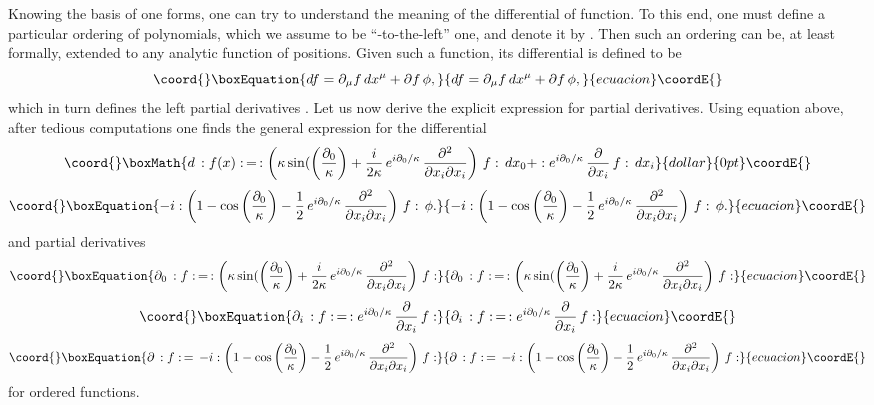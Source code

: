 \documentclass  [12pt] {article}
\begin{document}
Knowing the basis of one forms, one can try to understand the meaning of the
differential of  function. To this end, one must define a particular ordering
of polynomials, which we assume to be ``\coordHE{}-to-the-left'' one, and denote it
by \myHighlight{$:\, \ast \, :$}\coordHE{}. Then such an ordering can be, at least formally, extended
to any analytic function of positions. Given such a function, its differential
is defined to be
\begin{equation}\coord{}\boxEquation{\label{35}
df = \partial_\mu f\, dx^\mu + \partial f\, \phi,
}{df = \partial_\mu f\, dx^\mu + \partial f\, \phi,
}{ecuacion}\coordE{}\end{equation}
which in turn defines the left partial derivatives \myHighlight{$\partial_\mu, \partial$}\coordHE{}.
Let us now derive the explicit expression for partial derivatives. Using
equation above, after tedious computations one finds the general expression for
the differential \cite{5dcalc3}
$$\coord{}\boxMath{
d\, :f(x):\, = \, :\left(\kappa\sin(\left(\frac{\partial_0}\kappa\right) +
\frac{i}{2\kappa}\,  e^{i\partial_0/\kappa}\, \frac{\partial^2}{\partial
x_i\partial x_i}\right)\, f:\,  dx_0+ : e^{i\partial_0/\kappa}\,
\frac{\partial}{\partial x_i}\, f:\,  dx_i
}{dollar}{0pt}\coordE{}$$
\begin{equation}\coord{}\boxEquation{\label{36}
- i:\left( 1 -\cos\left(\frac{\partial_0}\kappa\right) - \frac12\,
e^{i\partial_0/\kappa}\, \frac{\partial^2}{\partial x_i\partial x_i}\right)\,
f:\, \phi.
}{- i:\left( 1 -\cos\left(\frac{\partial_0}\kappa\right) - \frac12\,
e^{i\partial_0/\kappa}\, \frac{\partial^2}{\partial x_i\partial x_i}\right)\,
f:\, \phi.
}{ecuacion}\coordE{}\end{equation}
and partial derivatives \cite{5dcalc3}
\begin{equation}\coord{}\boxEquation{\label{37}
\partial_0\, :f:\,= \,:\left(\kappa\sin(\left(\frac{\partial_0}\kappa\right) +
\frac{i}{2\kappa}\,  e^{i\partial_0/\kappa}\, \frac{\partial^2}{\partial
x_i\partial x_i}\right)\, f:
}{\partial_0\, :f:\,= \,:\left(\kappa\sin(\left(\frac{\partial_0}\kappa\right) +
\frac{i}{2\kappa}\,  e^{i\partial_0/\kappa}\, \frac{\partial^2}{\partial
x_i\partial x_i}\right)\, f:
}{ecuacion}\coordE{}\end{equation}
\begin{equation}\coord{}\boxEquation{\label{38}
  \partial_i\, :f:\,= \,: e^{i\partial_0/\kappa}\,
\frac{\partial}{\partial x_i}\, f:
}{\partial_i\, :f:\,= \,: e^{i\partial_0/\kappa}\,
\frac{\partial}{\partial x_i}\, f:
}{ecuacion}\coordE{}\end{equation}
\begin{equation}\coord{}\boxEquation{\label{39}
  \partial\, :f:\,= \,-i :\left( 1 -\cos\left(\frac{\partial_0}\kappa\right) - \frac12\,
e^{i\partial_0/\kappa}\, \frac{\partial^2}{\partial x_i\partial x_i}\right)\,
f:
}{\partial\, :f:\,= \,-i :\left( 1 -\cos\left(\frac{\partial_0}\kappa\right) - \frac12\,
e^{i\partial_0/\kappa}\, \frac{\partial^2}{\partial x_i\partial x_i}\right)\,
f:
}{ecuacion}\coordE{}\end{equation}
for ordered functions.
\end{document}
